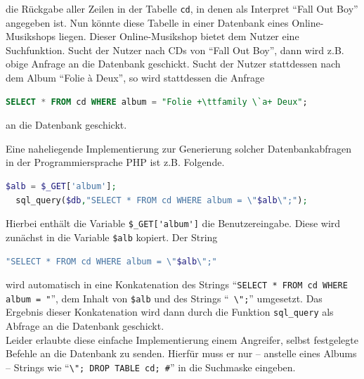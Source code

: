 die Rückgabe aller Zeilen in der Tabelle \lstinline+cd+, in denen als Interpret "`Fall Out Boy"' angegeben ist.
Nun könnte diese Tabelle in einer Datenbank eines Online-Musikshops liegen. Dieser Online-Musikshop bietet dem Nutzer eine Suchfunktion.
Sucht der Nutzer nach CDs von "`Fall Out Boy"', dann wird z.B. obige Anfrage an die Datenbank geschickt.
Sucht der Nutzer stattdessen nach dem Album "`Folie \`a Deux"', so wird stattdessen die Anfrage 

\begin{lstlisting}[language=SQL,escapechar=+]
  SELECT * FROM cd WHERE album = "Folie +\ttfamily \`a+ Deux";
\end{lstlisting}

an die Datenbank geschickt.

Eine naheliegende Implementierung zur Generierung solcher Datenbankabfragen in der Programmiersprache PHP ist z.B. Folgende.

\begin{lstlisting}[language=PHP]
  $alb = $_GET['album'];
  sql_query($db,"SELECT * FROM cd WHERE album = \"$alb\";");
\end{lstlisting}
\label{listing:impl:SqlInjectionInPhp}

Hierbei enthält die Variable \lstinline+$_GET['album']+ die Benutzereingabe. Diese wird zunächst in die Variable \lstinline+$alb+ kopiert. Der String

\begin{lstlisting}[language=PHP]
	"SELECT * FROM cd WHERE album = \"$alb\";"
\end{lstlisting}

wird automatisch in eine Konkatenation des Strings "`\lstinline+SELECT * FROM cd WHERE album = "+"', dem Inhalt von \lstinline+$alb+  und des Strings "`\lstinline+ \";+"' umgesetzt.
Das Ergebnis dieser Konkatenation wird dann durch die Funktion \lstinline+sql_query+ als Abfrage an die Datenbank geschickt.\\

Leider erlaubte diese einfache Implementierung einem Angreifer, selbst festgelegte Befehle an die Datenbank zu senden. Hierfür muss er nur -- anstelle eines Albums -- Strings wie "`\lstinline+\"; DROP TABLE cd; #+"' in die Suchmaske eingeben.

